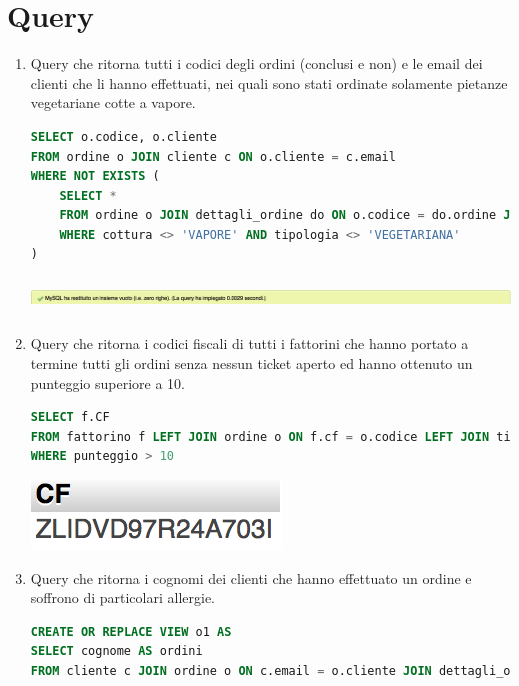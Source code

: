 \documentclass[10pt]{article}
\begin{document}
	\section{Query}
	\begin{enumerate}[noitemsep]
		\item Query che ritorna tutti i codici degli ordini (conclusi e non) e le email dei clienti che li hanno effettuati, nei quali sono stati ordinate solamente pietanze vegetariane cotte a vapore.
\begin{lstlisting}[language=sql]
SELECT o.codice, o.cliente
FROM ordine o JOIN cliente c ON o.cliente = c.email
WHERE NOT EXISTS (
	SELECT *
	FROM ordine o JOIN dettagli_ordine do ON o.codice = do.ordine JOIN pietanza p ON do.pietanza = p.codice
	WHERE cottura <> 'VAPORE' AND tipologia <> 'VEGETARIANA'
)
\end{lstlisting}
\begin{center}
\hspace*{-1cm}
\includegraphics[width=19cm, height=1cm]{query1.png}
\hspace*{-1cm}
\end{center}
	\item Query che ritorna i codici fiscali di tutti i fattorini che hanno portato a termine tutti gli ordini senza nessun ticket aperto ed hanno ottenuto un punteggio superiore a 10.
\begin{lstlisting}[language=sql]
SELECT f.CF 
FROM fattorino f LEFT JOIN ordine o ON f.cf = o.codice LEFT JOIN ticket t ON o.codice = t.ordine 
WHERE punteggio > 10
\end{lstlisting}	
\begin{center}
\hspace*{-1cm}
\includegraphics[scale=0.9]{query2.png}
\hspace*{-1cm}
\end{center}
	\item Query che ritorna i cognomi dei clienti che hanno effettuato un ordine e soffrono di particolari allergie.
	\begin{lstlisting}[language=sql]
CREATE OR REPLACE VIEW o1 AS
SELECT cognome AS ordini
FROM cliente c JOIN ordine o ON c.email = o.cliente JOIN dettagli_ordine as do ON o.codice = do.ordine

\end{lstlisting}
\end{enumerate}
\end{document}
